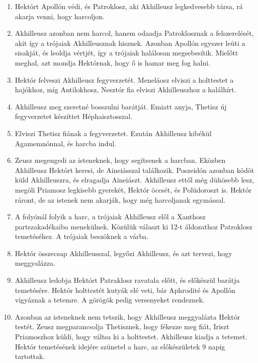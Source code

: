 \documentclass[]{article}
\begin{document}
\begin{enumerate}
				\item Hektórt Apollón védi, és Patroklosz, aki Akhilleusz legkedvesebb társa, rá akarja venni, hogy harcoljon.
				
				\item Akhilleusz azonban nem harcol, hanem odaadja Patroklosznak a felszerelését, akit így a trójaiak Akhilleusznak hisznek. Azonban Apollón egyszer leüti a sisakját, és leoldja vértjét, így a trójaiak halálosan megsebesítik. Mielőtt meghal, azt mondja Hektórnak, hogy ő is hamar meg fog halni.
				
				\item Hektór felveszi Akhilleusz fegyverzetét. Meneláosz elviszi a holttestet a hajókhoz, míg Antilokhosz, Nesztór fia elviszi Akhilleuszhoz a halálhírt.
				
				\item Akhilleusz meg szeretné bosszulni barátját. Emiatt anyja, Thetisz új fegyverzetet készíttet Héphaisztosszal.
				
				\item Elviszi Thetisz fiának a fegyverzetet. Ezután Akhilleusz kibékül Agamemnónnal, és harcba indul.
				
				\item Zeusz megengedi az isteneknek, hogy segítsenek a harcban. Eközben Akhilleusz Hektórt keresi, de Aineiásszal találkozik. Poszeidón azonban ködöt küld Akhilleuszra, és elragadja Aineiászt. Akhilleusz ettől még dühösebb lesz, megöli Priamosz legkisebb gyerekét, Hektór öccsét, és Polüdoroszt is. Hektór ráront, de az istenek nem akarják, hogy még harcoljanak egymással.
				
				\item A folyónál folyik a harc, a trójaiak Akhilleusz elől a Xanthosz partszakadékaiba menekülnek. Közülük választ ki 12-t áldozathoz Patroklosz temetéséhez. A trójaiak beszöknek a várba.
				
				\item Hektór összecsap Akhilleusszal, legyőzi Akhilleusz, és azt tervezi, hogy meggyalázza.
				
				\item Akhilleusz ledobja Hektórt Patraklosz ravatala előtt, és előkészül barátja temetésére. Hektór holttestét kutyák elé veti, bár Aphrodité és Apollón vigyáznak a tetemre. A görögök pedig versenyeket rendeznek.
				
				\item Azonban az isteneknek nem tetszik, hogy Akhilleusz meggyalázta Hektór testét. Zeusz megparancsolja Thetisznek, hogy fékezze meg fiát, Iriszt Priamoszhoz küldi, hogy váltsa ki a holttestet. Akhilleusz kiadja a tetemet. Hektór temetésének idejére szünetel a harc, az előkészületek 9 napig tartottak. 
			\end{enumerate}
			\cite{WIliasz_en}
			\cite{Iliasz_tartalom}


\end{document}
